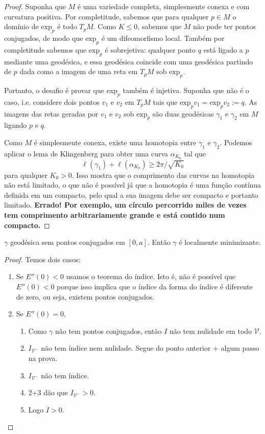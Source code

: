 \documentclass{book}
\begin{document}
\begin{proof}
Suponha que $M$ é uma variedade completa,
simplesmente conexa e com curvatura
positiva. Por completitude, sabemos que para
qualquer $p \in M$ o domínio de
$\text{exp}_p$ é todo $T_pM$. Como $K\leq 0$,
sabemos que $M$
não pode ter pontos conjugados, de modo que
$\text{exp}_p$ é um
difeomorfismo local. Também por completitude
sabemos que
$\text{exp}_p$ é sobrejetiva: qualquer ponto
$q$ está ligado a $p$
mediante uma geodésica, e essa geodésica
coincide com uma geodésica partindo de
$p$ dada como a imagem de uma reta em $T_pM$
sob $\text{exp}_p$.

Portanto, o desafio é provar que
$\text{exp}_p$ também é injetiva.
Suponha que não é o caso, i.e. considere dois
pontos $v_1$ e $v_2$ em
$T_pM$ tais que
$\text{exp}_pv_1=\text{exp}_pv_2:=q$. As
imagens das retas geradas por $v_1$ e $v_2$
sob $\text{exp}_p$ são
duas geodésicas $\gamma_1$ e $\gamma_2$ em
$M$ ligando $p$ e $q$.

Como $M$ é simplesmente conexa, existe uma
homotopia entre $\gamma_1$ e
$\gamma_2$. Podemos aplicar o lema de
Klingenberg para obter uma curva
$\alpha_{K_0}$ tal que $$
\ell(\gamma_1)+\ell(\alpha_{K_0}) \geq
2\pi/\sqrt{K_0} $$ para qualquer $K_0>0$.
Isso mostra que o comprimento das
curvas na homotopia não está limitado, o que
não é possível já que a homotopia é
uma função contínua definida em um compacto,
pelo qual a sua imagem debe ser
compacto e portanto limitado. {\bf Errado!
Por exemplo, um círculo percorrido
miles de vezes tem comprimento
arbitrariamente grande e está contido num
compacto.}
\end{proof}

\begin{exercise}
\label{exercise-geode-sem-ponto-conju-e}
$\gamma$ geodésica sem pontos conjugados em
$[0,a]$. Então $\gamma$ é localmente
minimizante.
\end{exercise}

\begin{proof}
Temos dois casos:
\begin{enumerate}
\item Se $E''(0)<0$ usamos o teorema do
índice. Isto é, não é possível que
 $E''(0)<0$ porque isso implica que o índice
 da forma do índice é diferente
 de zero, ou seja, existem pontos conjugados.
\item Se $E''(0)=0$,
\begin{enumerate}
\item[(0)] Como $\gamma$ não tem pontos
conjugados, então $I$ não tem
nulidade em todo  $\mathcal{V}$.
\item $I_{\mathcal{V}^-}$ não tem índice nem
nulidade. Segue do ponto anterior +
algum passo na prova.
\item $I_{\mathcal{V}^-}$ não tem índice.
\item 2+3 dão que $I_{\mathcal{V}^-}>0$.
\item Logo $I>0$.
\end{enumerate}
\end{enumerate}
\end{proof}
\end{document}
